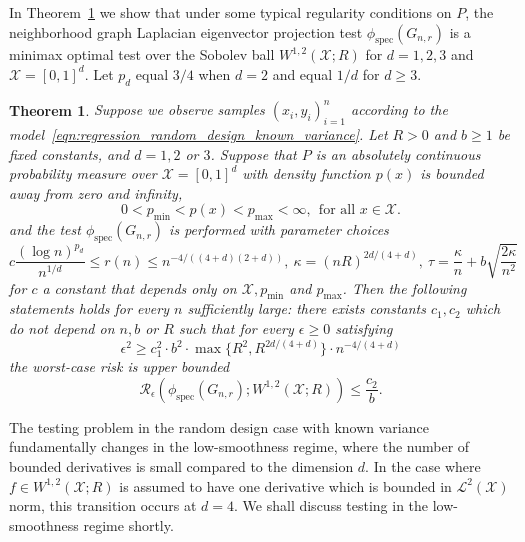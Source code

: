 \documentclass{article}
\newcommand{\1}{\mathbf{1}}
\newcommand{\Xset}{\mathcal{X}}
\newcommand{\Leb}{\mathcal{L}}
\newcommand{\spec}{\mathrm{spec}}
\theoremstyle{alden}
\theoremstyle{aldenthm}
\newtheorem{theorem}{Theorem}
\theoremstyle{definition}
\theoremstyle{remark}
\begin{document}
In Theorem~\ref{thm:sobolev_testing_rate_order1} we show that under some typical regularity conditions on $P$, the neighborhood graph Laplacian eigenvector projection test $\phi_{\textrm{spec}}(G_{n,r})$ is a minimax optimal test over the Sobolev ball $W^{1,2}(\mathcal{X};R)$ for $d = 1,2,3$ and $\Xset = [0,1]^d$. Let $p_d$ equal $3/4$ when $d = 2$ and equal $1/d$ for $d \geq 3$.

\begin{theorem}
	\label{thm:sobolev_testing_rate_order1}
	Suppose we observe samples $(x_i,y_i)_{i = 1}^{n}$ according to the model~\eqref{eqn:regression_random_design_known_variance}. Let $R > 0$ and $b \geq 1$ be fixed constants, and $d = 1,2$ or $3$. Suppose that $P$ is an absolutely continuous probability measure over $\mathcal{X} = [0,1]^d$ with density function $p(x)$ is bounded away from zero and infinity, 
	\begin{equation*}
	0 < p_{\min} < p(x) < p_{\max} < \infty,~~ \textrm{for all $x \in \mathcal{X}$.}
	\end{equation*}
	and the test $\phi_{\spec}(G_{n,r})$ is performed with parameter choices
	\begin{equation*}
	c \frac{(\log n)^{p_d}}{n^{1/d}} \leq r(n) \leq n^{-4/((4 + d)(2+d))}, ~\kappa = (nR)^{2d/(4 + d)}, ~\tau = \frac{\kappa}{n} + b\sqrt{\frac{2\kappa}{n^2}}
	\end{equation*}
	for $c$ a constant that depends only on $\Xset, p_{\min}$ and $p_{\max}$. Then the following statements holds for every $n$ sufficiently large: there exists constants $c_1,c_2$ which do not depend on $n,b$ or $R$ such that for every $\epsilon \geq 0$ satisfying
	\begin{equation}
	\label{eqn:sobolev_testing_rate_order1}
	\epsilon^2 \geq c_1^2 \cdot b^2 \cdot \max\{R^2,R^{2d/(4 + d)}\} \cdot n^{-4/(4 + d)}
	\end{equation}
	the worst-case risk is upper bounded
	\begin{equation}
	\label{eqn:sobolev_testing_rate_order1_1}
	\mathcal{R}_{\epsilon}(\phi_{\mathrm{spec}}(G_{n,r}); W^{1,2}(\mathcal{X};R)) \leq \frac{c_2}{b}.
	\end{equation}
\end{theorem}

The testing problem in the random design case with known variance fundamentally changes in the low-smoothness regime, where the number of bounded derivatives is small compared to the dimension $d$. In the case where $f \in W^{1,2}(\Xset;R)$ is assumed to have one derivative which is bounded in $\Leb^2(\Xset)$ norm, this transition occurs at $d = 4$. We shall discuss testing in the low-smoothness regime shortly.
\end{document}
